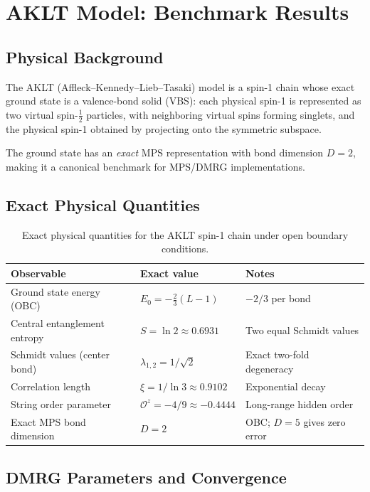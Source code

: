 \documentclass[aps,prb,onecolumn,scriptaddress]{revtex4-2}
\begin{document}
	\clearpage
	\section{AKLT Model: Benchmark Results}
	\label{sec:aklt_results}
	
	\subsection{Physical Background}
	
	The AKLT (Affleck--Kennedy--Lieb--Tasaki) model is a spin-1 chain
	whose exact ground state is a valence-bond solid (VBS):
	each physical spin-1 is represented as two virtual spin-$\tfrac{1}{2}$
	particles, with neighboring virtual spins forming singlets, and the
	physical spin-1 obtained by projecting onto the symmetric subspace.
	
	The ground state has an \emph{exact} MPS representation with bond dimension
	$D = 2$, making it a canonical benchmark for MPS/DMRG implementations.
	
	\subsection{Exact Physical Quantities}
	
	\begin{table}[h]
		\centering
		\begin{tabular}{lll}
			\toprule
			Observable & Exact value & Notes \\
			\midrule
			Ground state energy (OBC) & $E_0 = -\tfrac{2}{3}(L-1)$ & $-2/3$ per bond \\
			Central entanglement entropy & $S = \ln 2 \approx 0.6931$ & Two equal Schmidt values \\
			Schmidt values (center bond) & $\lambda_{1,2} = 1/\sqrt{2}$ & Exact two-fold degeneracy \\
			Correlation length & $\xi = 1/\ln 3 \approx 0.9102$ & Exponential decay \\
			String order parameter & $\mathcal{O}^z = -4/9 \approx -0.4444$ & Long-range hidden order \\
			Exact MPS bond dimension & $D = 2$ & OBC; $D=5$ gives zero error \\
			\bottomrule
		\end{tabular}
		\caption{Exact physical quantities for the AKLT spin-1 chain under
			open boundary conditions.}
	\end{table}
	
	\subsection{DMRG Parameters and Convergence}
	
\end{document}

